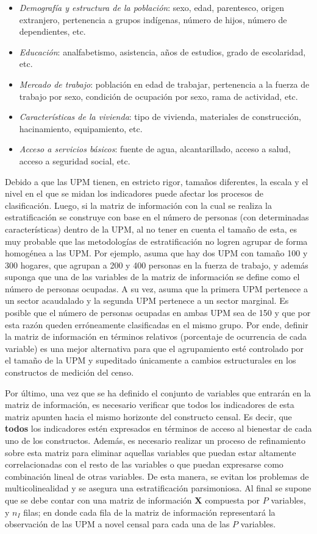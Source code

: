 \documentclass[12pt,spanish,]{book}
\providecommand{\tightlist}{%
  \setlength{\itemsep}{0pt}\setlength{\parskip}{0pt}}
\begin{document}
\begin{itemize}
\tightlist
\item
  \emph{Demografía y estructura de la población}: sexo, edad, parentesco, origen extranjero, pertenencia a grupos indígenas, número de hijos, número de dependientes, etc.
\item
  \emph{Educación}: analfabetismo, asistencia, años de estudios, grado de escolaridad, etc.
\item
  \emph{Mercado de trabajo}: población en edad de trabajar, pertenencia a la fuerza de trabajo por sexo, condición de ocupación por sexo, rama de actividad, etc.
\item
  \emph{Características de la vivienda}: tipo de vivienda, materiales de construcción, hacinamiento, equipamiento, etc.
\item
  \emph{Acceso a servicios básicos}: fuente de agua, alcantarillado, acceso a salud, acceso a seguridad social, etc.
\end{itemize}

Debido a que las UPM tienen, en estricto rigor, tamaños diferentes, la escala y el nivel en el que se midan los indicadores puede afectar los procesos de clasificación. Luego, si la matriz de información con la cual se realiza la estratificación se construye con base en el número de personas (con determinadas características) dentro de la UPM, al no tener en cuenta el tamaño de esta, es muy probable que las metodologías de estratificación no logren agrupar de forma homogénea a las UPM. Por ejemplo, asuma que hay dos UPM con tamaño 100 y 300 hogares, que agrupan a 200 y 400 personas en la fuerza de trabajo, y además suponga que una de las variables de la matriz de información se define como el número de personas ocupadas. A su vez, asuma que la primera UPM pertenece a un sector acaudalado y la segunda UPM pertenece a un sector marginal. Es posible que el número de personas ocupadas en ambas UPM sea de 150 y que por esta razón queden erróneamente clasificadas en el mismo grupo. Por ende, definir la matriz de información en términos relativos (porcentaje de ocurrencia de cada variable) es una mejor alternativa para que el agrupamiento esté controlado por el tamaño de la UPM y supeditado únicamente a cambios estructurales en los constructos de medición del censo.

Por último, una vez que se ha definido el conjunto de variables que entrarán en la matriz de información, es necesario verificar que todos los indicadores de esta matriz apunten hacia el mismo horizonte del constructo censal. Es decir, que \textbf{todos} los indicadores estén expresados en términos de acceso al bienestar de cada uno de los constructos. Además, es necesario realizar un proceso de refinamiento sobre esta matriz para eliminar aquellas variables que puedan estar altamente correlacionadas con el resto de las variables o que puedan expresarse como combinación lineal de otras variables. De esta manera, se evitan los problemas de multicolinealidad y se asegura una estratificación parsimoniosa. Al final se supone que se debe contar con una matriz de información \(\mathbf{X}\) compuesta por \(P\) variables, y \(n_I\) filas; en donde cada fila de la matriz de información representará la observación de las UPM a novel censal para cada una de las \(P\) variables.
\end{document}
